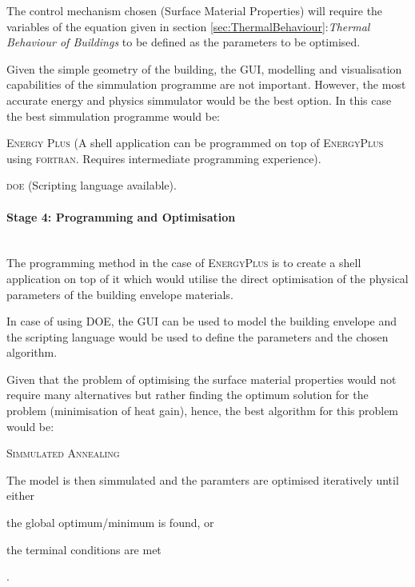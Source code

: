 The control mechanism chosen (Surface Material Properties) will require the variables of the equation given in section \ref{sec:ThermalBehaviour}:\emph{Thermal Behaviour of Buildings} to be defined as the parameters to be optimised.

Given the simple geometry of the building, the GUI, modelling and  visualisation capabilities of the simmulation programme are not important. However, the most accurate energy and physics simmulator would be the best option. In this case the best simmulation programme would be:

\begin{compactenum}
	\item \textsc{Energy Plus} (A shell application can be programmed on top of \textsc{EnergyPlus} using \textsc{fortran}. Requires intermediate programming experience).
	\item \textsc{doe} (Scripting language available).
\end{compactenum}

\paragraph{Stage 4: Programming and Optimisation}\mbox{}\\

The programming method in the case of \textsc{EnergyPlus} is to create a shell application on top of it which would utilise the direct optimisation of the physical parameters of the building envelope materials.

In case of using \textsc{DOE}, the GUI can be used to model the building envelope and the scripting language would be used to define the parameters and the chosen algorithm.

Given that the problem of optimising the surface material properties would not require many alternatives but rather finding the optimum solution for the problem (minimisation of heat gain), hence, the best algorithm for this problem would be:

\begin{compactenum}
\item \textsc{Simmulated Annealing}
\end{compactenum}

The model is then simmulated and the paramters are optimised iteratively until either \begin{inparaenum}[a)]\item the global optimum/minimum is found, or \item the terminal conditions are met\end{inparaenum}.

